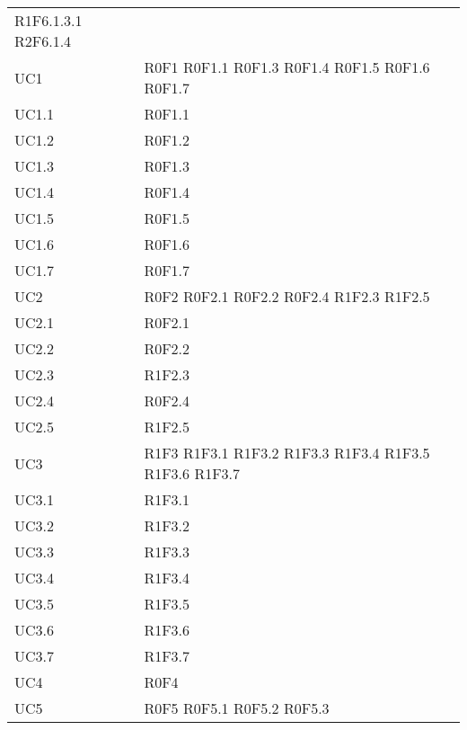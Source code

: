 \begin{longtable}{p{2.5cm}!{\VRule[1pt]}p{5.5cm}}
R1F6.1.3.1 \newline
R2F6.1.4 \\
UC1 & R0F1 
	\newline R0F1.1
	\newline R0F1.3
	\newline R0F1.4
	\newline R0F1.5
	\newline R0F1.6
	\newline R0F1.7\\
UC1.1 & R0F1.1\\
UC1.2 & R0F1.2\\
UC1.3 & R0F1.3\\
UC1.4 & R0F1.4\\
UC1.5 & R0F1.5\\
UC1.6 & R0F1.6\\
UC1.7 & R0F1.7\\
UC2 & R0F2
	\newline R0F2.1
	\newline R0F2.2
	\newline R0F2.4
	\newline R1F2.3
	\newline R1F2.5\\
UC2.1 & R0F2.1\\
UC2.2 & R0F2.2\\
UC2.3 & R1F2.3\\
UC2.4 & R0F2.4\\
UC2.5 & R1F2.5\\
UC3 & R1F3
	\newline R1F3.1
	\newline R1F3.2
	\newline R1F3.3
	\newline R1F3.4
	\newline R1F3.5
	\newline R1F3.6
	\newline R1F3.7\\
UC3.1 & R1F3.1\\
UC3.2 & R1F3.2\\
UC3.3 & R1F3.3\\
UC3.4 & R1F3.4\\
UC3.5 & R1F3.5\\
UC3.6 & R1F3.6\\
UC3.7 & R1F3.7\\
UC4 & R0F4\\
UC5 & R0F5
	\newline R0F5.1
	\newline R0F5.2
	\newline R0F5.3\\

\end{longtable}
